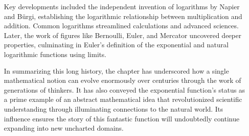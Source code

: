 Key developments included the independent invention of logarithms by Napier and Bürgi, establishing the logarithmic relationship between multiplication and addition. Common logarithms streamlined calculations and advanced sciences. Later, the work of figures like Bernoulli, Euler, and Mercator uncovered deeper properties, culminating in Euler's definition of the exponential and natural logarithmic functions using limits.

In summarizing this long history, the chapter has underscored how a single mathematical notion can evolve enormously over centuries through the work of generations of thinkers. It has also conveyed the exponential function's status as a prime example of an abstract mathematical idea that revolutionized scientific understanding through illuminating connections to the natural world. Its influence ensures the story of this fantastic function will undoubtedly continue expanding into new uncharted domains.
